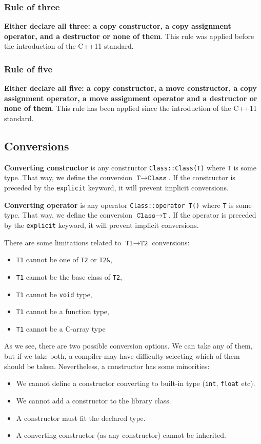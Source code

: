\documentclass[../main]{subfiles}
\begin{document}
\subsubsection{Rule of three}
    \textbf{Either declare all three: a copy constructor, a copy assignment operator, and a destructor or none of them}.
This rule was applied before the introduction of the C++11 standard.
    
\subsubsection{Rule of five}
    \textbf{Either declare all five: a copy constructor, a move constructor, a copy assignment operator, a move assignment operator and a destructor or none of them}.
This rule has been applied since the introduction of the C++11 standard.

\subsection{Conversions}
    \textbf{Converting constructor} is any constructor \texttt{Class::Class(T)} where \texttt{T} is some type. That way, we define the conversion $\texttt{T} \rightarrow \texttt{Class}$.
If the constructor is preceded by the \texttt{explicit} keyword, it will prevent implicit conversions.\newline

    \textbf{Converting operator} is any operator \texttt{Class::operator T()} where \texttt{T} is some type. That way, we define the conversion $\texttt{Class} \rightarrow \texttt{T}$.
If the operator is preceded by the \texttt{explicit} keyword, it will prevent implicit conversions.\newline

    There are some limitations related to $\texttt{T1} \rightarrow \texttt{T2}$ conversions:
\begin{itemize}
    \item \texttt{T1} cannot be one of \texttt{T2} or \texttt{T2\&},
    \item \texttt{T1} cannot be the base class of \texttt{T2},
    \item \texttt{T1} cannot be \texttt{void} type,
    \item \texttt{T1} cannot be a function type,
    \item \texttt{T1} cannot be a C-array type
\end{itemize}

    As we see, there are two possible conversion options. We can take any of them, but if we take both, a compiler may have difficulty selecting which of them should be taken.
Nevertheless, a constructor has some minorities:
\begin{itemize}
    \item We cannot define a constructor converting to built-in type (\texttt{int}, \texttt{float} etc).
    \item We cannot add a constructor to the library class.
    \item A constructor must fit the declared type.
    \item A converting constructor (as any constructor) cannot be inherited.
\end{itemize}
\end{document}
